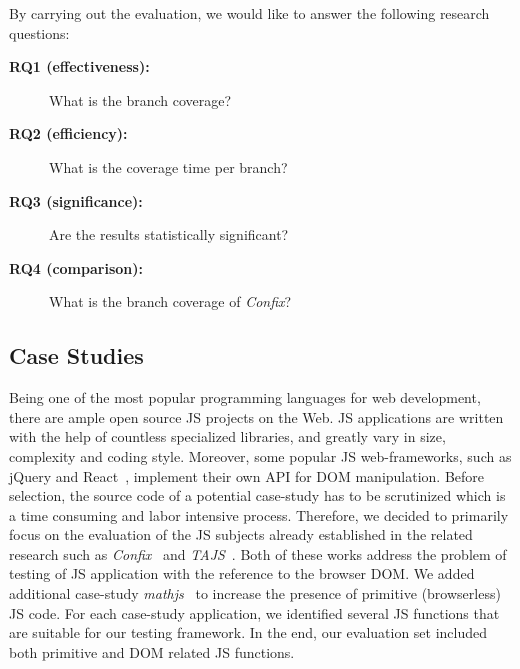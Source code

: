 By carrying out the evaluation, we would like to answer the following research questions:
\begin{description}
\item[\textbf{RQ1 (effectiveness):}] What is the branch coverage?
\item[\textbf{RQ2 (efficiency):}] What is the coverage time per branch?
\item[\textbf{RQ3 (significance):}] Are the results statistically significant?
\item[\textbf{RQ4 (comparison):}] What is the branch coverage of \emph{Confix}?
\end{description}


\subsection{Case Studies}
\label{sub.sec.case.studies}



Being one of the most popular programming languages for web development, there are ample open source JS projects on the Web. JS applications are written with the help of countless specialized libraries, and greatly vary in size, complexity and coding style. Moreover, some popular JS web-frameworks, such as jQuery and React~\cite{todomvc}, implement their own API for DOM manipulation. Before selection, the source code of a potential case-study has to be scrutinized which is a time consuming and labor intensive process. Therefore, we decided to primarily focus on the evaluation of the JS subjects already established in the related research such as \emph{Confix}~\cite{amin:ase15} and \emph{TAJS}~\cite{dom2011, tajsbenchmarks}. Both of these works address the problem of testing of JS application with the reference to the browser DOM. We added additional case-study \emph{mathjs}~\cite{mathjs} to increase the presence of primitive (browserless) JS code. For each case-study application, we identified several JS functions that are suitable for our testing framework. In the end, our evaluation set included both primitive and DOM related JS functions.

